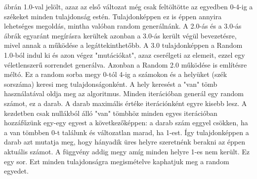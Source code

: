 \documentclass[12ppt,a4paper,oneside]{report}
\begin{document}
           
          ábrán 1.0-val jelölt, azaz az első változat még csak feltöltötte az egyedben 0-4-ig a székeket minden tulajdonság estén.
         Tulajdonképpen ez is éppen annyira lehetséges megoldás, mintha valóban random generálnánk.
         A 2.0-ás és a 3.0-ás ábrák egyaránt megírásra kerültek azonban a 3.0-ás került végül bevezetésre, mivel annak a működése a legáttekinthetőbb.
         A 3.0 tulajdonképpen a Random 1.0-ból indul ki és azon végez "mutációkat", azaz cserélgeti az elemeit, ezzel egy véletlenszerű sorrendet generálva.
         Azonban a Random 2.0 működése is említésre méltó.
         Ez a random sorba megy 0-tól 4-ig a számokon és a helyüket (szék sorszáma) keresi meg tulajdonságonként.
         A hely keresést a "van" tömb használatával oldja meg az algoritmus.
         Minden iterációban generál egy random számot, ez a darab.
         A darab maximális értéke iterációnként egyre kisebb lesz.
         A kezdetben csak nullákból álló "van" tömbhöz minden egyes iterációban hozzáfűzünk egy-egy egyest a következőképpen: a darab szám eggyel csökken, ha a van tömbben 0-t találunk és változatlan marad, ha 1-est.
         Így tulajdonképpen a darab azt mutatja meg, hogy hányadik üres helyre szeretnénk berakni az éppen aktuális számot.
         A függvény addig megy amíg minden helyre 1-es nem került.
         Ez egy sor.
         Ezt minden tulajdonságra megismételve kaphatjuk meg a random egyedet.
            
\end{document}
